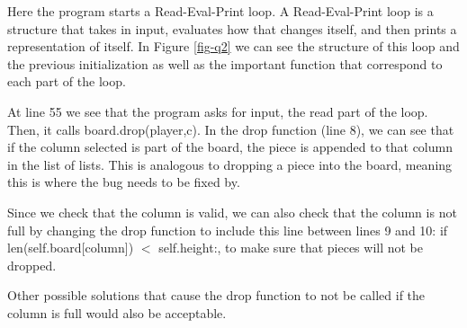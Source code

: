 Here the program starts a Read-Eval-Print loop. A Read-Eval-Print loop is a structure that takes in input, evaluates how that changes itself, and then prints a representation of itself. In Figure \ref{fig-q2} we can see the structure of this loop and the previous initialization as well as the important function that correspond to each part of the loop.

At line 55 we see that the program asks for input, the read part of the loop.
Then, it calls board.drop(player,c).
In the drop function (line 8), we can see that if the column selected is part of the board,
	the piece is appended to that column in the list of lists.
This is analogous to dropping a piece into the board, meaning this is where the bug needs to be fixed by.

Since we check that the column is valid,
	we can also check that the column is not full by changing the drop function to include this line between lines 9 and 10:
if len(self.board[column]) $<$ self.height:, to make sure that pieces will not be dropped.

Other possible solutions that cause the drop function to not be called if the column is full would also be acceptable.

\newpage